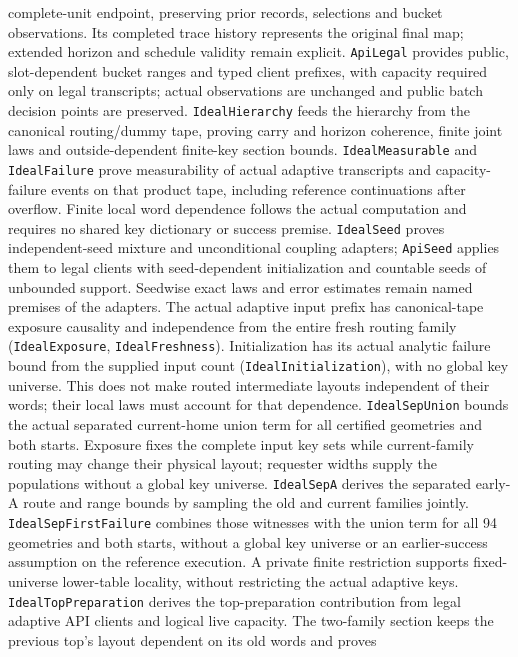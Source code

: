 \documentclass[11pt]{article}
\theoremstyle{definition}
\theoremstyle{remark}
\begin{document}
complete-unit endpoint, preserving prior records, selections and bucket
observations. Its completed trace history represents the original final map;
extended horizon and schedule validity remain explicit. \texttt{ApiLegal}
provides public, slot-dependent bucket ranges and typed client prefixes, with
capacity required only on legal transcripts; actual observations are unchanged
and public batch decision points are preserved. \texttt{IdealHierarchy} feeds
the hierarchy from the canonical routing/dummy tape, proving carry and horizon
coherence, finite joint laws and outside-dependent finite-key section bounds.
\texttt{IdealMeasurable} and \texttt{IdealFailure} prove measurability of
actual adaptive transcripts and capacity-failure events on that product tape,
including reference continuations after overflow. Finite local word dependence
follows the actual computation and requires no shared key dictionary or success
premise. \texttt{IdealSeed} proves independent-seed mixture and unconditional
coupling adapters; \texttt{ApiSeed} applies them to legal clients with
seed-dependent initialization and countable seeds of unbounded support.
Seedwise exact laws and error estimates remain named premises of the adapters.
The actual adaptive input prefix has canonical-tape exposure causality
and independence from the entire fresh routing family
(\texttt{IdealExposure}, \texttt{IdealFreshness}). Initialization has its actual
analytic failure bound from the supplied input count
(\texttt{IdealInitialization}), with no global key universe.
This does not make routed intermediate layouts independent of their words;
their local laws must account for that dependence.
\texttt{IdealSepUnion} bounds the actual separated current-home union term
for all certified geometries and both starts. Exposure fixes the complete
input key sets while current-family routing may change their physical layout;
requester widths supply the populations without a global key universe.
\texttt{IdealSepA} derives the separated early-A route and range bounds by
sampling the old and current families jointly. \texttt{IdealSepFirstFailure}
combines those witnesses with the union term for all 94 geometries and both
starts, without a global key universe or an earlier-success assumption on the
reference execution. A private finite restriction supports fixed-universe lower-table
locality, without restricting the actual adaptive keys.
\texttt{IdealTopPreparation} derives the top-preparation contribution
from legal adaptive API clients and logical live capacity. The two-family
section keeps the previous top's layout dependent on its old words and proves
\end{document}
